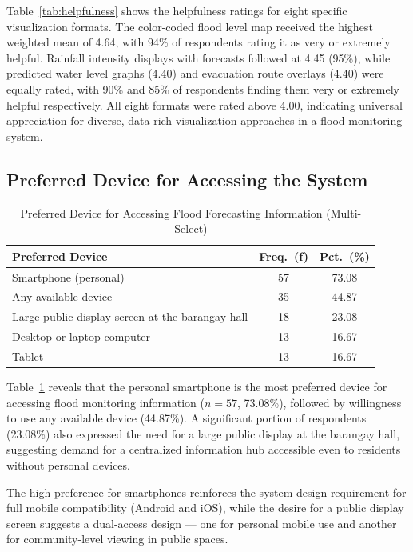 \documentclass{research}
\begin{document}
Table~\ref{tab:helpfulness} shows the helpfulness ratings for eight specific visualization
formats. The color-coded flood level map received the highest weighted mean of 4.64,
with 94\% of respondents rating it as very or extremely helpful. Rainfall intensity
displays with forecasts followed at 4.45 (95\%), while predicted water level graphs
(4.40) and evacuation route overlays (4.40) were equally rated, with 90\% and 85\% of
respondents finding them very or extremely helpful respectively. All eight formats were
rated above 4.00, indicating universal appreciation for diverse, data-rich visualization
approaches in a flood monitoring system.

\subsection{Preferred Device for Accessing the System}

\begin{table}[htbp]
\centering
\small
\caption{Preferred Device for Accessing Flood Forecasting Information (Multi-Select)}
\label{tab:device}
\begin{tabular}{p{9.5cm}|c|c}
\hline
\textbf{Preferred Device} & \textbf{Freq.\ (f)} & \textbf{Pct.\ (\%)} \\
\hline
Smartphone (personal)                                      & 57 & 73.08 \\
Any available device                                       & 35 & 44.87 \\
Large public display screen at the barangay hall           & 18 & 23.08 \\
Desktop or laptop computer                                 & 13 & 16.67 \\
Tablet                                                     & 13 & 16.67 \\
\hline
\end{tabular}
\end{table}

Table~\ref{tab:device} reveals that the personal smartphone is the most preferred device
for accessing flood monitoring information ($n=57$, 73.08\%), followed by willingness to
use any available device (44.87\%). A significant portion of respondents (23.08\%) also
expressed the need for a large public display at the barangay hall, suggesting demand
for a centralized information hub accessible even to residents without personal devices.
 
The high preference for smartphones reinforces the system design requirement for full
mobile compatibility (Android and iOS), while the desire for a public display screen
suggests a dual-access design --- one for personal mobile use and another for
community-level viewing in public spaces.
\end{document}
